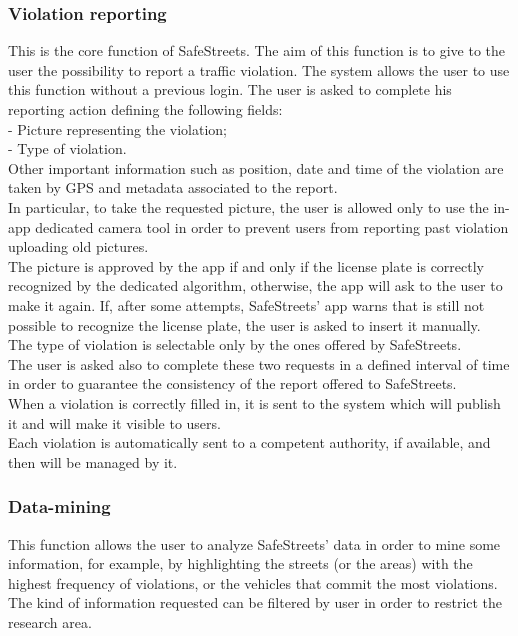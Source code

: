 \documentclass{article}
\begin{document}
			\subsubsection{Violation reporting}
				This is the core function of SafeStreets. The aim of this function is to give to the user the possibility to report a traffic violation. The system allows the user to use this function without a previous login. The user is asked to complete his reporting action defining the following fields:\\
				- Picture representing the violation;\\
				- Type of violation.\\
				Other important information such as position, date and time of the violation are taken by GPS and metadata associated to the report.\\
				In particular, to take the requested picture, the user is allowed only to use the in-app dedicated camera tool in order to prevent users from reporting past violation uploading old pictures.\\ The picture is approved by the app if and only if the license plate is correctly recognized by the dedicated algorithm, otherwise, the app will ask to the user to make it again. If, after some attempts, SafeStreets' app warns that is still not possible to recognize the license plate, the user is asked to insert it manually. \\The type of violation is selectable only by the ones offered by SafeStreets.\\ The user is asked also to complete these two requests in a defined interval of time in order to guarantee the consistency of the report offered to SafeStreets.\\
				When a violation is correctly filled in, it is sent to the system which will publish it and will make it visible to users.\\
				Each violation is automatically sent to a competent authority, if available, and then will be managed by it.
		
		\subsubsection{Data-mining}
			This function allows the user to analyze SafeStreets' data in order to mine some information, for example, by highlighting the streets (or the areas) with the highest frequency of violations, or the vehicles that commit the most violations. The kind of information requested can be filtered by user in order to restrict the research area. \\
		
\end{document}
